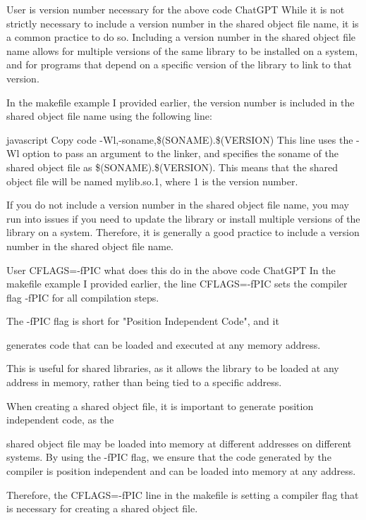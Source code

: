 \documentclass{article}
\begin{document}
  User is version number necessary for the above code ChatGPT While it
  is not strictly necessary to include a version number in the shared
  object file name, it is a common practice to do so. Including a
  version number in the shared object file name allows for multiple
  versions of the same library to be installed on a system, and for
  programs that depend on a specific version of the library to link to
  that version.

  In the makefile example I provided earlier, the version number is
  included in the shared object file name using the following line:

  javascript Copy code -Wl,-soname,\$(SONAME).\$(VERSION) This line uses
  the -Wl option to pass an argument to the linker, and specifies the
  soname of the shared object file as \$(SONAME).\$(VERSION). This means
  that the shared object file will be named mylib.so.1, where 1 is the
  version number.

  If you do not include a version number in the shared object file name,
  you may run into issues if you need to update the library or install
  multiple versions of the library on a system. Therefore, it is
  generally a good practice to include a version number in the shared
  object file name.





  User CFLAGS=-fPIC what does this do in the above code ChatGPT In the
  makefile example I provided earlier, the line CFLAGS=-fPIC sets the
  compiler flag -fPIC for all compilation steps.

  The -fPIC flag is short for "Position Independent Code", and it
  
  generates code that can be loaded and executed at any memory address.
  
  This is useful for shared libraries, as it allows the library to be
  loaded at any address in memory, rather than being tied to a specific
  address.

  When creating a shared object file, it is important to generate
  position independent code, as the
  
  shared object file may be loaded into memory at different addresses on
  different systems. By using the -fPIC flag, we ensure that the code
  generated by the compiler is position independent and can be loaded
  into memory at any address.

  Therefore, the CFLAGS=-fPIC line in the makefile is setting a compiler
  flag that is necessary for creating a shared object file.
\end{document}
